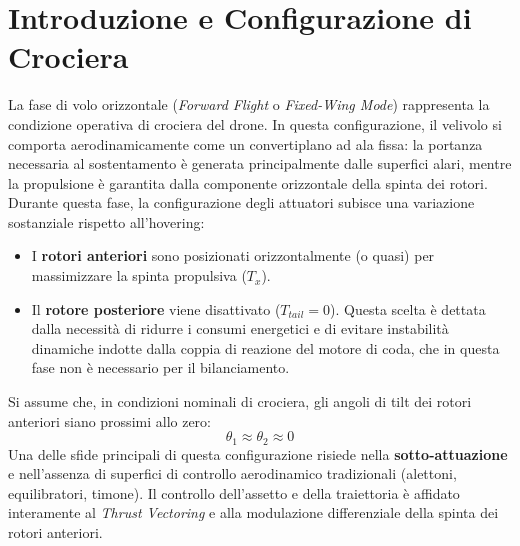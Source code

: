 \section{Introduzione e Configurazione di Crociera}
La fase di volo orizzontale (\textit{Forward Flight} o \textit{Fixed-Wing Mode}) rappresenta la condizione operativa di crociera del drone. In questa configurazione, il velivolo si comporta aerodinamicamente come un convertiplano ad ala fissa: la portanza necessaria al sostentamento è generata principalmente dalle superfici alari, mentre la propulsione è garantita dalla componente orizzontale della spinta dei rotori.\\
Durante questa fase, la configurazione degli attuatori subisce una variazione sostanziale rispetto all'hovering:
\begin{itemize}
    \item I \textbf{rotori anteriori} sono posizionati orizzontalmente (o quasi) per massimizzare la spinta propulsiva ($T_x$).
    \item Il \textbf{rotore posteriore} viene disattivato ($T_{tail} = 0$). Questa scelta è dettata dalla necessità di ridurre i consumi energetici e di evitare instabilità dinamiche indotte dalla coppia di reazione del motore di coda, che in questa fase non è necessario per il bilanciamento.
\end{itemize}
Si assume che, in condizioni nominali di crociera, gli angoli di tilt dei rotori anteriori siano prossimi allo zero:
\begin{equation}
    \theta_1 \approx \theta_2 \approx 0
\end{equation}
Una delle sfide principali di questa configurazione risiede nella \textbf{sotto-attuazione} e nell'assenza di superfici di controllo aerodinamico tradizionali (alettoni, equilibratori, timone). Il controllo dell'assetto e della traiettoria è affidato interamente al \textit{Thrust Vectoring} e alla modulazione differenziale della spinta dei rotori anteriori.

